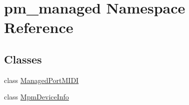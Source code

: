 \hypertarget{namespacepm__managed}{}\section{pm\+\_\+managed Namespace Reference}
\label{namespacepm__managed}
\subsection*{Classes}
\begin{DoxyCompactItemize}
\item 
class \hyperlink{classpm__managed_1_1_managed_port_m_i_d_i}{Managed\+Port\+M\+I\+DI}
\item 
class \hyperlink{classpm__managed_1_1_mpm_device_info}{Mpm\+Device\+Info}
\end{DoxyCompactItemize}
